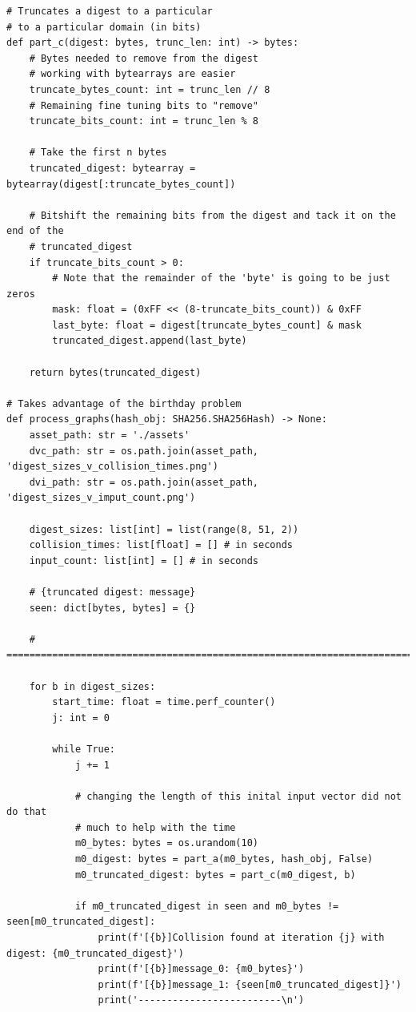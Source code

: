 \documentclass[11pt]{article}
\begin{document}
\begin{lstlisting}
# Truncates a digest to a particular
# to a particular domain (in bits)
def part_c(digest: bytes, trunc_len: int) -> bytes:
    # Bytes needed to remove from the digest 
    # working with bytearrays are easier
    truncate_bytes_count: int = trunc_len // 8
    # Remaining fine tuning bits to "remove"
    truncate_bits_count: int = trunc_len % 8

    # Take the first n bytes
    truncated_digest: bytearray = bytearray(digest[:truncate_bytes_count])

    # Bitshift the remaining bits from the digest and tack it on the end of the
    # truncated_digest
    if truncate_bits_count > 0:
        # Note that the remainder of the 'byte' is going to be just zeros
        mask: float = (0xFF << (8-truncate_bits_count)) & 0xFF
        last_byte: float = digest[truncate_bytes_count] & mask
        truncated_digest.append(last_byte)

    return bytes(truncated_digest)

# Takes advantage of the birthday problem 
def process_graphs(hash_obj: SHA256.SHA256Hash) -> None:
    asset_path: str = './assets' 
    dvc_path: str = os.path.join(asset_path, 'digest_sizes_v_collision_times.png')
    dvi_path: str = os.path.join(asset_path, 'digest_sizes_v_imput_count.png') 

    digest_sizes: list[int] = list(range(8, 51, 2))
    collision_times: list[float] = [] # in seconds
    input_count: list[int] = [] # in seconds

    # {truncated digest: message}
    seen: dict[bytes, bytes] = {}

    # =======================================================================

    for b in digest_sizes:
        start_time: float = time.perf_counter()
        j: int = 0

        while True:
            j += 1
           
            # changing the length of this inital input vector did not do that
            # much to help with the time
            m0_bytes: bytes = os.urandom(10)
            m0_digest: bytes = part_a(m0_bytes, hash_obj, False)
            m0_truncated_digest: bytes = part_c(m0_digest, b)
            
            if m0_truncated_digest in seen and m0_bytes != seen[m0_truncated_digest]:
                print(f'[{b}]Collision found at iteration {j} with digest: {m0_truncated_digest}')
                print(f'[{b}]message_0: {m0_bytes}')
                print(f'[{b}]message_1: {seen[m0_truncated_digest]}')
                print('-------------------------\n')


\end{lstlisting}
\end{document}
